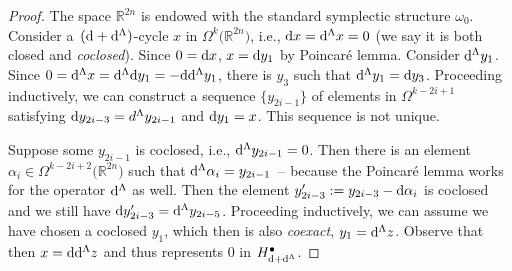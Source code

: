 \documentclass[10pt,a4paper]{amsart}
\numberwithin{equation}{section}
\begin{document}
\begin{proof}
The space $\mathbb{R}^{2n}$ is endowed with the standard symplectic structure $\omega_0$. Consider a~$({\rm d}+{\rm d}^{\Lambda})$-cycle $x$ in $\Omega^k\big(\mathbb{R}^{2n}\big)$, i.e., ${\rm d}x={\rm d}^{\Lambda}x=0$ (we say it is both closed and \emph{coclosed}). Since $0={\rm d}x$, $x={\rm d}y_1$ by Poincar\'e lemma. Consider ${\rm d}^{\Lambda}y_1$. Since $0={\rm d}^{\Lambda}x={\rm d}^{\Lambda} {\rm d} y_1=-{\rm d} {\rm d}^{\Lambda} y_1$, there is $y_3$ such that ${\rm d}^{\Lambda}y_1={\rm d}y_3$. Proceeding inductively, we can construct a sequence $\{y_{2i-1}\}$ of elements in $\Omega^{k-2i+1}$ satisfying ${\rm d}y_{2i-3}=d^{\Lambda}y_{2i-1}$ and ${\rm d}y_1=x$. This sequence is not unique.

Suppose some $y_{2i-1}$ is coclosed, i.e., ${\rm d}^{\Lambda}y_{2i-1}=0$. Then there is an element $\alpha_i\in \Omega^{k-2i+2}\big(\mathbb{R}^{2n}\big)$ such that ${\rm d}^{\Lambda}\alpha_i=y_{2i-1}$~-- because the Poincar\'e lemma works for the operator ${\rm d}^{\Lambda}$ as well. Then the element $y'_{2i-3}:=y_{2i-3}-{\rm d} \alpha_i$ is coclosed and we still have ${\rm d}y'_{2i-3}={\rm d}^{\Lambda}y_{2i-5}$. Proceeding inductively, we can assume we have chosen a coclosed $y_1$, which then is also \emph{coexact}, $y_1={\rm d}^{\Lambda}z$. Observe that then $x={\rm d}{\rm d}^{\Lambda}z$ and thus represents 0 in $H^{\bullet}_{{\rm d}+{\rm d}^{\Lambda}}$.


\end{proof}
\end{document}
